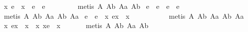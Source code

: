 \begin{isabellebody}
\endisatagproof
{\isafoldproof}%
%
\isadelimproof
%
\endisadelimproof
\isanewline
{}\isamarkupfalse%
\ {\isachardoublequoteopen}{\isacharparenleft}\isactrlbold {\isasymexists}x{\isachardot}\ e\ {\isasymapprox}\ {\isacharparenleft}x{\isasymbox}{\isacharparenright}{\isacharparenright}\ \isactrlbold {\isasymleftrightarrow}\ e\ {\isasymapprox}\ {\isacharparenleft}{\isasymbox}e{\isacharparenright}{\isachardoublequoteclose}%
\isadelimproof
\ \ \ \ \ \ \ %
\endisadelimproof
%
\isatagproof
{}\isamarkupfalse%
\ {\isacharparenleft}metis\ A{}\ A{}b\ A{}a\ A{}b{\isacharparenright}%
\endisatagproof
{\isafoldproof}%
%
\isadelimproof
%
\endisadelimproof
\isanewline
{}\isamarkupfalse%
\ {\isachardoublequoteopen}e\ {\isasymapprox}\ {\isacharparenleft}{\isasymbox}e{\isacharparenright}\ \isactrlbold {\isasymleftrightarrow}\ e\ {\isasymapprox}\ {\isacharparenleft}e{\isasymbox}{\isacharparenright}{\isachardoublequoteclose}%
\isadelimproof
\ \ \ \ \ \ \ \ \ \ \ \ \ %
\endisadelimproof
%
\isatagproof
{}\isamarkupfalse%
\ {\isacharparenleft}metis\ A{}\ A{}b\ A{}a\ A{}b\ A{}a{\isacharparenright}%
\endisatagproof
{\isafoldproof}%
%
\isadelimproof
%
\endisadelimproof
\isanewline
{}\isamarkupfalse%
\ {\isachardoublequoteopen}e\ {\isasymapprox}\ {\isacharparenleft}e{\isasymbox}{\isacharparenright}\ \isactrlbold {\isasymleftrightarrow}\ {\isacharparenleft}\isactrlbold {\isasymforall}x{\isachardot}\ e{\isasymcdot}x\ {\isasymgreaterapprox}\ x{\isacharparenright}{\isachardoublequoteclose}%
\isadelimproof
\ \ \ \ \ \ \ \ \ %
\endisadelimproof
%
\isatagproof
{}\isamarkupfalse%
\ {\isacharparenleft}metis\ A{}\ A{}b\ A{}a\ A{}b\ A{}a{\isacharparenright}%
\endisatagproof
{\isafoldproof}%
%
\isadelimproof
%
\endisadelimproof
\ \isanewline
{}\isamarkupfalse%
\ {\isachardoublequoteopen}{\isacharparenleft}\isactrlbold {\isasymforall}x{\isachardot}\ e{\isasymcdot}x\ {\isasymgreaterapprox}\ x{\isacharparenright}\ \isactrlbold {\isasymleftrightarrow}\ {\isacharparenleft}\isactrlbold {\isasymforall}x{\isachardot}\ x{\isasymcdot}e\ {\isasymgreaterapprox}\ x{\isacharparenright}{\isachardoublequoteclose}%
\isadelimproof
\ \ \ \ \ %
\endisadelimproof
%
\isatagproof
{}\isamarkupfalse%
\ {\isacharparenleft}metis\ A{}\ A{}b\ A{}a\ A{}b{\isacharparenright}%
\endisatagproof
{\isafoldproof}%

\end{isabellebody}
